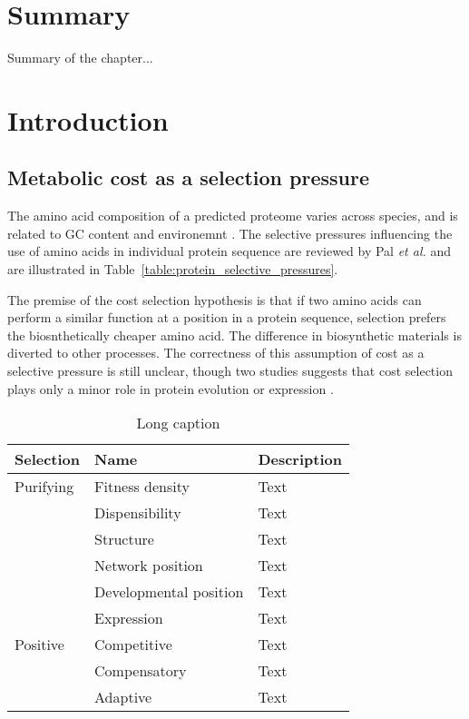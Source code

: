 \section*{Summary}

Summary of the chapter...

\clearpage

\section{Introduction}

\subsection{Metabolic cost as a selection pressure}

The amino acid composition of a predicted proteome varies across species, and is related to GC content and environemnt \cite{tekaia2006}. The selective pressures influencing the use of amino acids in individual protein sequence are reviewed by Pal \emph{et al.} \cite{pal2006} and are illustrated in Table~\vref{table:protein_selective_pressures}.

The premise of the cost selection hypothesis \cite{akashi2002} is that if two amino acids can perform a similar function at a position in a protein sequence, selection prefers the biosnthetically cheaper amino acid. The difference in biosynthetic materials is diverted to other processes. The correctness of this assumption of cost as a selective pressure is still unclear, though two studies suggests that cost selection plays only a minor role in protein evolution \cite{rocha2004} or expression \cite{raiford2008}.

\begin{table}
  \centering
  \begin{tabular}{ l l l }
  \toprule
  Selection & Name                   & Description \\ \midrule
  Purifying & Fitness density        & Text \\
            & Dispensibility         & Text \\
            & Structure              & Text \\
            & Network position       & Text \\
            & Developmental position & Text \\
            & Expression             & Text \\
  Positive  & Competitive            & Text \\
            & Compensatory           & Text \\
            & Adaptive               & Text \\ \bottomrule
  \end{tabular}
  \caption[Factors in protein evolution]{Long caption}
  \label{table:protein_selective_pressures}
\end{table}

